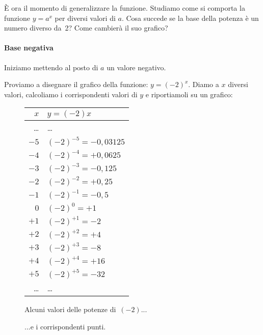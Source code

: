 È ora il momento di generalizzare la funzione. 
Studiamo come si comporta la funzione \(y=a^x\) per diversi valori di \(a\).
Cosa succede se la base della potenza è un numero diverso da~2? 
Come cambierà il suo grafico?

\paragraph{Base negativa}
\label{par:esplog_basenegativa}

Iniziamo mettendo al posto di \(a\) un valore negativo.

Proviamo a disegnare il grafico della funzione: \(y=(-2)^x\).
Diamo a \(x\) diversi valori, calcoliamo i corrispondenti valori di \(y\) e 
riportiamoli su un grafico:

\begin{figure}[h]
 \centering
 \begin{minipage}[]{.48\textwidth}
 \vspace*{.6cm}
  \begin{center}
   \begin{tabular}{r|l}
    $x$   & $y=(-2)x$ \\
    \hline
    \dots & \dots \\
    $-5$ & $(-2)^{-5} = -0,03125$ \\
    $-4$ & $(-2)^{-4} = +0,0625$ \\
    $-3$ & $(-2)^{-3} = -0,125$ \\
    $-2$ & $(-2)^{-2} = +0,25$ \\
    $-1$ & $(-2)^{-1} = -0,5$ \\
    $0$ & $(-2)^{0} = +1$ \\
    $+1$ & $(-2)^{+1} = -2$ \\
    $+2$ & $(-2)^{+2} = +4$ \\
    $+3$ & $(-2)^{+3} = -8$ \\
    $+4$ & $(-2)^{+4} = +16$ \\
    $+5$ & $(-2)^{+5} = -32$ \\
    \dots & \dots \\
   \end{tabular}
 \vspace*{.6cm}
  \caption{Alcuni valori delle potenze di~\((-2)\)...} \label{tab:potmenodue0}
  \end{center}
 \end{minipage}
\begin{minipage}[]{.48\textwidth}
\begin{center}
\begin{inaccessibleblock}
  \puntimenodue
  \caption{...e i corrispondenti punti.} \label{fig:potmenodue0}
\end{inaccessibleblock}
\end{center}
\end{minipage}
\end{figure}

